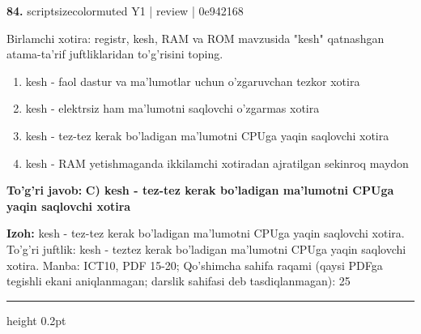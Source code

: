 \documentclass[10pt,a4paper]{article}
\begin{document}
{\bfseries\sffamily\color{ink} 84.} {scriptsizecolor{muted} Y1 | review | 0e942168}
\par
Birlamchi xotira: registr, kesh, RAM va ROM mavzusida "kesh" qatnashgan atama-ta'rif juftliklaridan to'g'risini toping.
\begin{enumerate}[label=\Alph*),leftmargin=9mm]
\item kesh - faol dastur va ma'lumotlar uchun o'zgaruvchan tezkor xotira
\item kesh - elektrsiz ham ma'lumotni saqlovchi o'zgarmas xotira
\item kesh - tez-tez kerak bo'ladigan ma'lumotni CPUga yaqin saqlovchi xotira
\item kesh - RAM yetishmaganda ikkilamchi xotiradan ajratilgan sekinroq maydon
\end{enumerate}
\begin{tcolorbox}[enhanced,breakable,colback=teal!4,colframe=teal!60!black,boxrule=0.45pt,arc=1.2mm,left=2.7mm,right=2.7mm,top=1.8mm,bottom=1.8mm,before skip=2mm,after skip=2mm]
{\bfseries\sffamily\color{teal}To'g'ri javob:} \textbf{C) kesh - tez-tez kerak bo'ladigan ma'lumotni CPUga yaqin saqlovchi xotira}
\par\smallskip
{\bfseries Izoh:} kesh - tez-tez kerak bo'ladigan ma'lumotni CPUga yaqin saqlovchi xotira. To'g'ri juftlik: kesh - teztez kerak bo'ladigan ma'lumotni CPUga yaqin saqlovchi xotira. Manba: ICT10, PDF 15-20; Qo'shimcha sahifa raqami (qaysi PDFga tegishli ekani aniqlanmagan; darslik sahifasi deb tasdiqlanmagan): 25
\end{tcolorbox}
\vspace{2mm}\hrule height 0.2pt\vspace{3mm}
\end{document}
